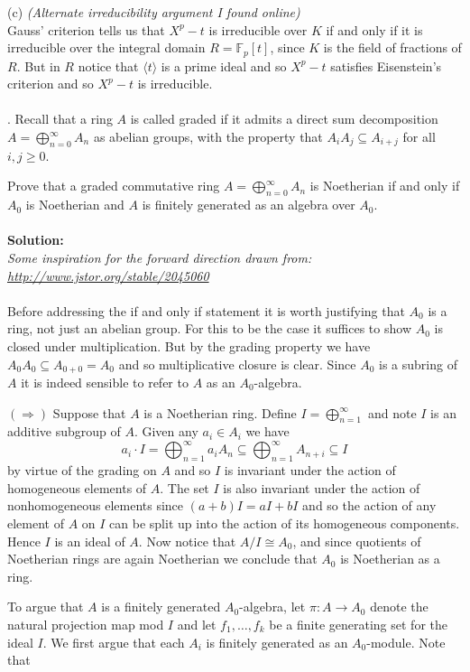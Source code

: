 \documentclass[11pt]{article}
\newcommand{\F}{\mathbb{F}}
\begin{document}
(c) \emph{(Alternate irreducibility argument I found online)}\\
Gauss' criterion tells us that $X^p-t$ is irreducible over $K$ if and only if it is irreducible over the integral domain $R=\F_p[t]$, since $K$ is the field of fractions of $R$. But in $R$ notice that $\langle t\rangle$ is a prime ideal and so $X^p-t$ satisfies Eisenstein's criterion and so $X^p-t$ is irreducible.\\\\


. Recall that a ring $A$ is called graded if it admits a direct sum decomposition $A = \bigoplus_{n=0}^\infty A_n$ as abelian groups, with the property that $A_iA_j \subseteq A_{i+j}$
for all $i, j \ge 0$.

Prove that a graded commutative ring $A = \bigoplus_{n=0}^\infty A_n$ is Noetherian if and only if $A_0$ is
Noetherian and $A$ is finitely generated as an algebra over $A_0$.\\\\
\textbf{Solution:}\\
\emph{Some inspiration for the forward direction drawn from: \url{http://www.jstor.org/stable/2045060}}\\\\
Before addressing the if and only if statement it is worth justifying that $A_0$ is a ring, not just an abelian group. For this to be the case it suffices to show $A_0$ is closed under multiplication. But by the grading property we have $A_0 A_0 \subseteq A_{0+0} = A_0$ and so multiplicative closure is clear. Since $A_0$ is a subring of $A$ it is indeed sensible to refer to $A$ as an $A_0$-algebra.

$(\Rightarrow)$ Suppose that $A$ is a  Noetherian ring. Define $I= \bigoplus_{n=1}^\infty$ and note $I$ is an additive subgroup of $A$. Given any $a_i\in A_i$ we have \[
a_i\cdot I = \bigoplus_{n=1}^\infty a_i A_n \subseteq \bigoplus_{n=1}^\infty A_{n+i} \subseteq I
\]
by virtue of the grading on $A$ and so $I$ is invariant under the action of homogeneous elements of $A$. The set $I$ is also invariant under the action of nonhomogeneous elements since $(a+b)I = aI + b I$ and so the action of any element of $A$ on $I$ can be split up into the action of its homogeneous components. Hence $I$ is an ideal of $A$. Now notice that $A/I \cong A_0$, and since quotients of Noetherian rings are again Noetherian we conclude that $A_0$ is Noetherian as a ring. 

To argue that $A$ is a finitely generated $A_0$-algebra, let $\pi:A\to A_0$ denote the natural projection map mod $I$ and let $f_1,\ldots,f_k$ be a finite generating set for the ideal $I$. We first argue that each $A_i$ is finitely generated as an $A_0$-module. Note that 
\end{document}
